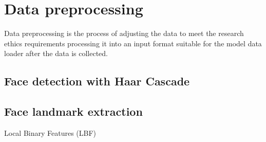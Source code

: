 \section{Data preprocessing}
\label{sec:Data preprocessing} %
Data preprocessing is the process of adjusting the data to meet the research ethics requirements processing it into an input format suitable for the model data loader after the data is collected.

\subsection{Face detection with Haar Cascade} %

\subsection{Face landmark extraction} %
Local Binary Features (LBF)